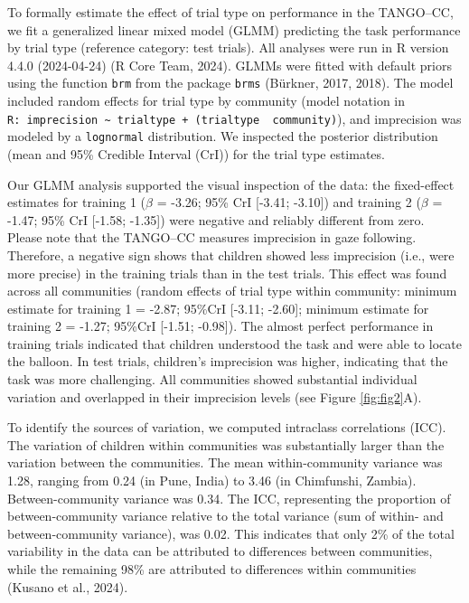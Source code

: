 \documentclass[
  man,floatsintext]{apa7}
\begin{document}
To formally estimate the effect of trial type on performance in the TANGO--CC, we fit a generalized linear mixed model (GLMM) predicting the task performance by trial type (reference category: test trials).
All analyses were run in R version 4.4.0 (2024-04-24) (R Core Team, 2024).
GLMMs were fitted with default priors using the function \texttt{brm} from the package \texttt{brms} (Bürkner, 2017, 2018).
The model included random effects for trial type by community (model notation in \texttt{R:\ imprecision\ \textasciitilde{}\ trialtype\ +\ (trialtype\ \textbar{}\ community)}), and imprecision was modeled by a \texttt{lognormal} distribution.
We inspected the posterior distribution (mean and 95\% Credible Interval (CrI)) for the trial type estimates.

Our GLMM analysis supported the visual inspection of the data: the fixed-effect estimates for training 1 (\(\beta\) = -3.26; 95\% CrI {[}-3.41; -3.10{]}) and training 2 (\(\beta\) = -1.47; 95\% CrI {[}-1.58; -1.35{]}) were negative and reliably different from zero.
Please note that the TANGO--CC measures imprecision in gaze following.
Therefore, a negative sign shows that children showed less imprecision (i.e., were more precise) in the training trials than in the test trials.
This effect was found across all communities (random effects of trial type within community: minimum estimate for training 1 = -2.87; 95\%CrI {[}-3.11; -2.60{]}; minimum estimate for training 2 = -1.27; 95\%CrI {[}-1.51; -0.98{]}).
The almost perfect performance in training trials indicated that children understood the task and were able to locate the balloon.
In test trials, children's imprecision was higher, indicating that the task was more challenging.
All communities showed substantial individual variation and overlapped in their imprecision levels (see Figure \ref{fig:fig2}A).

To identify the sources of variation, we computed intraclass correlations (ICC).
The variation of children within communities was substantially larger than the variation between the communities.
The mean within-community variance was 1.28, ranging from 0.24 (in Pune, India) to 3.46 (in Chimfunshi, Zambia).
Between-community variance was 0.34.
The ICC, representing the proportion of between-community variance relative to the total variance (sum of within- and between-community variance), was 0.02.
This indicates that only 2\% of the total variability in the data can be attributed to differences between communities, while the remaining 98\% are attributed to differences within communities (Kusano et al., 2024).
\end{document}
